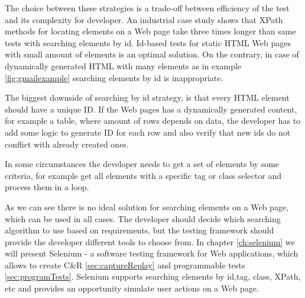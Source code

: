 		The choice between these strategies is a trade-off between efficiency of
		the test and its complexity for developer. An industrial case study shows that 
		XPath methods for locating elements on a Web page take 
		three times longer than same tests with searching
    elements by id\cite{selenium4}. 
	   Id-based tests for static HTML Web pages with small amount of elements
	   is an optimal solution. On the contrary, in case of dynamically
	   generated HTML with many elements as in example \ref{fig:gmailexample}
	   searching elements by id is inappropriate.
		
		The biggest downside of searching by id strategy, is that every HTML element
		should have a unique ID. If the Web pages has a dynamically generated content,
		for example a table, where amount of rows depends on data, the
		developer has to add some logic to generate ID for each row and also verify
		that new ids do not conflict with already created ones. 
		
		In some circumstances the developer needs to get a set of elements by some
		criteria, for example get all elements with a specific tag or class selector
		and process them in a loop. 
		
		As we can see there is no ideal solution for searching elements on a Web page,
		which can be used in all cases. The developer should decide which
		searching algorithm to use based on requirements, but the testing framework
		should provide the developer different tools to choose from. In chapter
		\ref{ch:selenium} we will present Selenium - a software testing framework
		for Web applications, which allows to create C\&R \ref{sec:captureReplay} and 
    programmable tests \ref{sec:programTests}. Selenium  supports searching
    elements by id,tag, class, XPath, etc and provides an opportunity simulate
    user actions on a Web page.
		

 